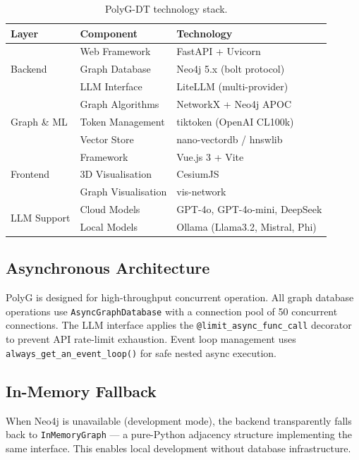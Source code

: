 \documentclass[12pt,a4paper]{article}
\begin{document}
\begin{table}[htbp]
\centering
\caption{PolyG-DT technology stack.}
\label{tab:stack}
\begin{tabular}{lll}
\toprule
\textbf{Layer} & \textbf{Component} & \textbf{Technology} \\
\midrule
\multirow{3}{*}{Backend}
  & Web Framework       & FastAPI + Uvicorn \\
  & Graph Database      & Neo4j 5.x (bolt protocol) \\
  & LLM Interface       & LiteLLM (multi-provider) \\
\midrule
\multirow{3}{*}{Graph \& ML}
  & Graph Algorithms    & NetworkX + Neo4j APOC \\
  & Token Management    & tiktoken (OpenAI CL100k) \\
  & Vector Store        & nano-vectordb / hnswlib \\
\midrule
\multirow{3}{*}{Frontend}
  & Framework           & Vue.js 3 + Vite \\
  & 3D Visualisation    & CesiumJS \\
  & Graph Visualisation & vis-network \\
\midrule
\multirow{2}{*}{LLM Support}
  & Cloud Models        & GPT-4o, GPT-4o-mini, DeepSeek \\
  & Local Models        & Ollama (Llama3.2, Mistral, Phi) \\
\bottomrule
\end{tabular}
\end{table}

\subsection{Asynchronous Architecture}

PolyG is designed for high-throughput concurrent operation. All graph
database operations use \texttt{AsyncGraphDatabase} with a connection
pool of 50 concurrent connections. The LLM interface applies the
\texttt{@limit\_async\_func\_call} decorator to prevent API rate-limit
exhaustion. Event loop management uses \texttt{always\_get\_an\_event\_loop()}
for safe nested async execution.

\subsection{In-Memory Fallback}

When Neo4j is unavailable (development mode), the backend transparently
falls back to \texttt{InMemoryGraph} — a pure-Python adjacency structure
implementing the same interface. This enables local development without
database infrastructure.
\end{document}
